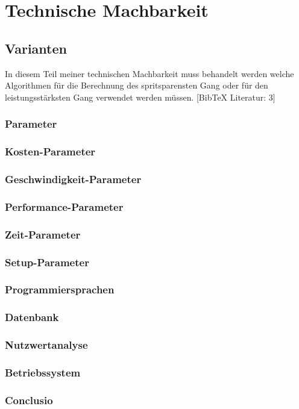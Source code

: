 \chapter {Technische Machbarkeit}
\section {Varianten}
In diesem Teil meiner technischen Machbarkeit muss behandelt werden welche Algorithmen für die Berechnung des spritsparensten Gang oder für den leistungsstärksten Gang verwendet werden müssen.
[BibTeX Literatur: 3]
\subsection {Parameter}

\subsection {Kosten-Parameter}

\subsection {Geschwindigkeit-Parameter}

\subsection {Performance-Parameter}

\subsection {Zeit-Parameter}

\subsection {Setup-Parameter}

\subsection {Programmiersprachen}
\subsection {Datenbank}
\subsection {Nutzwertanalyse}
\subsection {Betriebssystem}
\subsection {Conclusio}